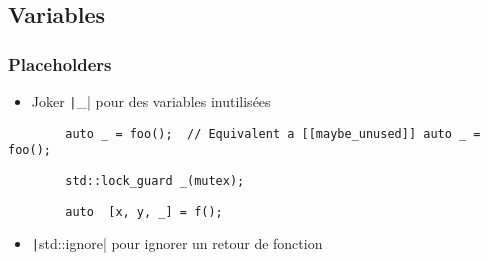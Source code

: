 \documentclass[C++.tex]{subfiles}
\begin{document}
\subsection*{Variables}
\begin{frame}[fragile]
	\frametitle{Placeholders}
	\begin{itemize}
		\item Joker \texttt|_| pour des variables inutilisées
	\end{itemize}

	\begin{verbatim}
		auto _ = foo();  // Equivalent a [[maybe_unused]] auto _ = foo();
	\end{verbatim}

	\begin{verbatim}
		std::lock_guard _(mutex);
	\end{verbatim}

	\begin{verbatim}
		auto  [x, y, _] = f();
	\end{verbatim}


	\begin{itemize}
		\item \texttt|std::ignore| pour ignorer un retour de fonction
	\end{itemize}


\end{frame}
\end{document}
